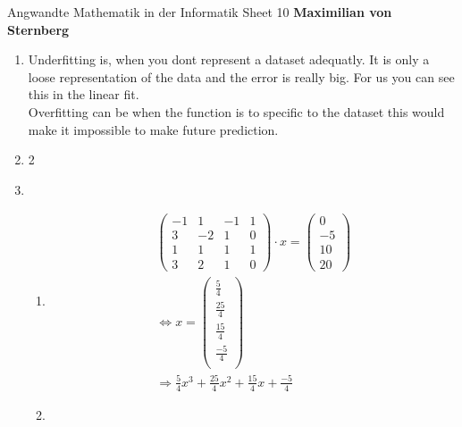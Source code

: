 \documentclass[]{book}
\theoremstyle{definition}
\begin{document}
\begin{center}
{\Large Angwandte Mathematik in der Informatik \hspace{0.5cm} Sheet 10}
\textbf{Maximilian von Sternberg} %
\end{center}

\vspace{0.2 cm}

\begin{enumerate}
    \item Underfitting is, when you dont represent a dataset adequatly. It is only a loose representation of the data and the error is really big. For us you can see this in the linear fit. \\ Overfitting can be when the function is to specific to the dataset this would make it impossible to make future prediction. 
    \item 2
    \item \begin{enumerate}
        \item \begin{align*}
            \begin{pmatrix}
                -1 & 1 & -1 & 1 \\
                3 & -2 & 1 & 0 \\
                1 & 1 & 1 & 1 \\
                3 & 2 & 1 & 0 
            \end{pmatrix}
            \cdot x = \begin{pmatrix}
                0 \\ 
                -5 \\
                10 \\
                20
            \end{pmatrix}\\
            \Leftrightarrow x = \begin{pmatrix}
                \frac{5}{4} \\
                \frac{25}{4} \\
                \frac{15}{4} \\
                \frac{-5}{4} \\
            \end{pmatrix}
            \\
            \Rightarrow \frac{5}{4}x^3 + \frac{25}{4}x^2 +\frac{15}{4}x +\frac{-5}{4}
        \end{align*}
        \item \begin{align*}

\end{align*}
\end{enumerate}
\end{enumerate}
\end{document}
